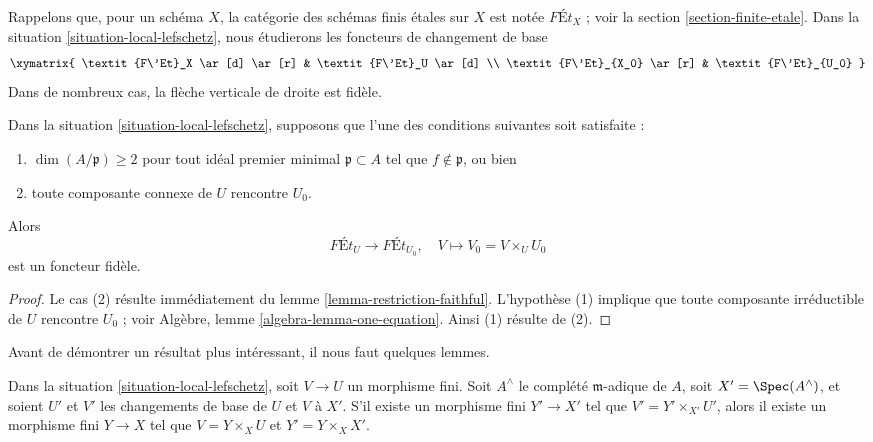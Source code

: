 \noindent
Rappelons que, pour un schéma $X$, la catégorie des schémas finis
étales sur $X$ est notée $\textit{F\'Et}_X$ ; voir la
section \ref{section-finite-etale}.
Dans la situation \ref{situation-local-lefschetz},
nous étudierons les foncteurs de changement de base
$$
\xymatrix{
\textit{F\'Et}_X \ar[d] \ar[r] & \textit{F\'Et}_U \ar[d] \\
\textit{F\'Et}_{X_0} \ar[r] & \textit{F\'Et}_{U_0}
}
$$
Dans de nombreux cas, la flèche verticale de droite est fidèle.

\begin{lemma}
\label{lemma-faithful}
Dans la situation \ref{situation-local-lefschetz},
supposons que l'une des conditions suivantes soit satisfaite :
\begin{enumerate}
\item $\dim(A/\mathfrak p) \geq 2$ pour tout idéal premier minimal
$\mathfrak p \subset A$ tel que $f \not \in \mathfrak p$, ou bien
\item toute composante connexe de $U$ rencontre $U_0$.
\end{enumerate}
Alors
$$
\textit{F\'Et}_U \longrightarrow \textit{F\'Et}_{U_0},\quad
V \longmapsto V_0 = V \times_U U_0
$$
est un foncteur fidèle.
\end{lemma}

\begin{proof}
Le cas (2) résulte immédiatement du lemme \ref{lemma-restriction-faithful}.
L'hypothèse (1) implique que toute composante irréductible de $U$ rencontre $U_0$ ; voir
Algèbre, lemme \ref{algebra-lemma-one-equation}.
Ainsi (1) résulte de (2).
\end{proof}

\noindent
Avant de démontrer un résultat plus intéressant, il nous faut quelques lemmes.

\begin{lemma}
\label{lemma-fill-in-missing}
Dans la situation \ref{situation-local-lefschetz}, soit $V \to U$ un morphisme
fini. Soit $A^\wedge$ le complété $\mathfrak m$-adique de $A$,
soit $X' = \Spec(A^\wedge)$, et soient $U'$ et $V'$ les changements de base de
$U$ et $V$ à $X'$. S'il existe un morphisme fini $Y' \to X'$ tel que
$V' = Y' \times_{X'} U'$, alors il existe un morphisme fini $Y \to X$
tel que $V = Y \times_X U$ et $Y' = Y \times_X X'$.
\end{lemma}

